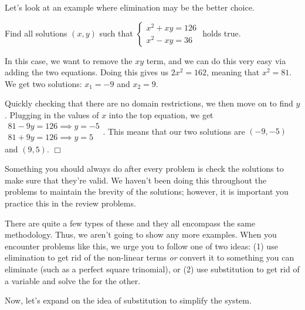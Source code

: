 \documentclass[../book.tex]{subfiles}
\begin{document}
Let's look at an example where elimination may be the better choice.
\begin{example}
Find all solutions $(x,y)$ such that $\begin{cases} x^2+xy=126 \\ x^2-xy=36 \end{cases}$ holds true.
\end{example}
\begin{solution}
In this case, we want to remove the $xy$ term, and we can do this very easy via adding the two equations.  Doing this gives us $2x^2=162$, meaning that $x^2=81$.  We get two solutions: $x_1=-9$ and $x_2=9$.  

Quickly checking that there are no domain restrictions, we then move on to find $y$.  Plugging in the values of $x$ into the top equation, we get $\begin{matrix} 81-9y=126 \implies y=-5 \\ 81+9y=126 \implies y=5 \end{matrix}$.  This means that our two solutions are $(-9,-5)$ and $(9,5)$.  $\Box$
\end{solution}
\begin{note}
Something you should always do after every problem is check the solutions to make sure that they're valid.  We haven't been doing this throughout the problems to maintain the brevity of the solutions; however, it is important you practice this in the review problems.
\end{note}
There are quite a few types of these and they all encompass the same methodology.  Thus, we aren't going to show any more examples.  When you encounter problems like this, we urge you to follow one of two ideas: (1) use elimination to get rid of the non-linear terms \textit{or} convert it to something you can eliminate (such as a perfect square trinomial), or (2) use substitution to get rid of a variable and solve the for the other.

Now, let's expand on the idea of substitution to simplify the system.
\end{document}
